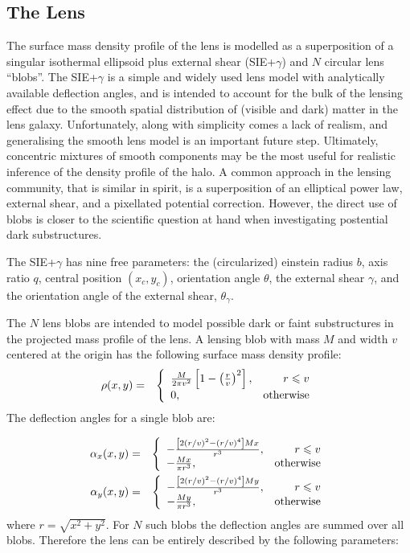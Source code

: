 \documentclass[useAMS,usenatbib]{mn2e}
\begin{document}
\subsection{The Lens}
The surface mass density profile of the lens is modelled as a superposition
of a singular isothermal ellipsoid plus external shear (SIE+$\gamma$) and
$N$ circular lens ``blobs''. The SIE+$\gamma$ is a simple and widely used lens
model with analytically available deflection angles, and is intended to account
for the bulk of the lensing effect due to the smooth spatial distribution
of (visible and dark) matter in the lens galaxy. Unfortunately, along with
simplicity comes a lack of realism, and generalising the smooth lens model
is an important future step. Ultimately, concentric
mixtures of smooth components may be the most useful for realistic inference
of the density profile of the halo. A common approach in the lensing
community, that is similar in spirit, is a superposition of an elliptical
power law, external shear, and a pixellated potential correction. However, the
direct use of blobs is closer to the scientific question at hand
when investigating postential dark substructures.

The SIE+$\gamma$ has nine free parameters:
the (circularized) einstein radius $b$, axis ratio $q$, central position
$(x_c, y_c)$, orientation angle $\theta$, the external shear $\gamma$, and the
orientation angle of the external shear, $\theta_{\gamma}$.

The $N$ lens blobs are intended to model possible dark or faint substructures
in the projected mass profile of the lens.
A lensing blob with mass $M$ and width $v$
centered at the origin has the following surface mass density profile:
\begin{eqnarray}
\rho(x, y) &=& \left\{
\begin{array}{lr}
\frac{M}{2\pi v^2}\left[1 - \left(\frac{r}{v}\right)^2\right], & r \leq v\\
0, & \textnormal{otherwise}
\end{array}
\right.
\end{eqnarray}
The deflection angles for a single blob are:


\begin{eqnarray}
\alpha_x(x, y) &=&
\left\{
\begin{array}{lr}
-\frac{\left[2(r/v)^2 - (r/v)^4\right]Mx}{r^3}, & r \leq v\\
-\frac{Mx}{\pi r^3}, & \textnormal{otherwise}
\end{array}
\right.\\
\alpha_y(x, y) &=&
\left\{
\begin{array}{lr}
-\frac{\left[2(r/v)^2 - (r/v)^4\right]My}{r^3}, & r \leq v\\
-\frac{My}{\pi r^3}, & \textnormal{otherwise}
\end{array}
\right.
\end{eqnarray}
where $r=\sqrt{x^2 + y^2}$. For $N$ such blobs the deflection angles are
summed over all blobs. Therefore the lens can be entirely described by
the following parameters:
\end{document}
